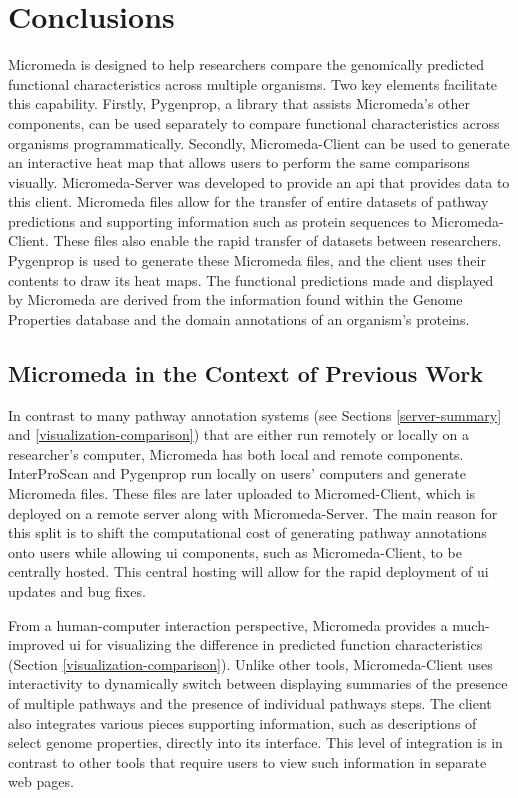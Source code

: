 \chapter{Conclusions} \label{conclusion-chapter}

Micromeda is designed to help researchers compare the genomically predicted 
functional characteristics across multiple organisms. Two key elements facilitate 
this capability. Firstly, Pygenprop, a library that assists Micromeda's other 
components, can be used separately to compare functional characteristics across 
organisms programmatically. Secondly, Micromeda-Client can be used to generate 
an interactive heat map that allows users to perform the same comparisons 
visually. Micromeda-Server was developed to provide an \gls{api} that provides 
data to this client. Micromeda files allow for the transfer of entire datasets 
of pathway predictions and supporting information such as protein sequences to 
Micromeda-Client. These files also enable the rapid transfer of datasets between 
researchers. Pygenprop is used to generate these Micromeda files, and the client 
uses their contents to draw its heat maps. The functional predictions made and 
displayed by Micromeda are derived from the information found within the Genome 
Properties database and the domain annotations of an organism's proteins. 

\section{Micromeda in the Context of Previous Work}

In contrast to many pathway annotation systems (see Sections 
\ref{server-summary} and \ref{visualization-comparison}) that are either run 
remotely or locally on a researcher's computer, Micromeda has both local and 
remote components. InterProScan and Pygenprop run locally on users' computers 
and generate Micromeda files. These files are later uploaded to Micromed-Client, 
which is deployed on a remote server along with Micromeda-Server. The main 
reason for this split is to shift the computational cost of generating pathway 
annotations onto users while allowing \gls{ui} components, such as 
Micromeda-Client, to be centrally hosted. This central hosting will allow for 
the rapid deployment of \gls{ui} updates and bug fixes.

From a human-computer interaction perspective, Micromeda provides a 
much-improved \gls{ui} for visualizing the difference in predicted function 
characteristics (Section \ref{visualization-comparison}). Unlike other tools, 
Micromeda-Client uses interactivity to dynamically switch between displaying 
summaries of the presence of multiple pathways and the presence of individual 
pathways steps. The client also integrates various pieces supporting information, such 
as descriptions of select genome properties, directly into its interface. This 
level of integration is in contrast to other tools that require users to view 
such information in separate web pages.

